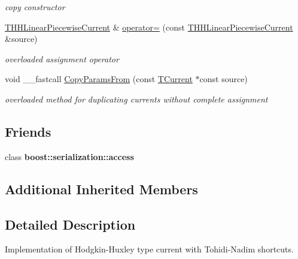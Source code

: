 \begin{DoxyCompactItemize}
\begin{DoxyCompactList}\small\item\em copy constructor \end{DoxyCompactList}\item 
\hypertarget{class_t_h_h_linear_piecewise_current_a4000d88fe350057e43d165737419b816}{\hyperlink{class_t_h_h_linear_piecewise_current}{T\+H\+H\+Linear\+Piecewise\+Current} \& \hyperlink{class_t_h_h_linear_piecewise_current_a4000d88fe350057e43d165737419b816}{operator=} (const \hyperlink{class_t_h_h_linear_piecewise_current}{T\+H\+H\+Linear\+Piecewise\+Current} \&source)}\label{class_t_h_h_linear_piecewise_current_a4000d88fe350057e43d165737419b816}

\begin{DoxyCompactList}\small\item\em overloaded assignment operator \end{DoxyCompactList}\item 
\hypertarget{class_t_h_h_linear_piecewise_current_a884f539c84bd751b9411078cc70cca21}{void \+\_\+\+\_\+fastcall \hyperlink{class_t_h_h_linear_piecewise_current_a884f539c84bd751b9411078cc70cca21}{Copy\+Params\+From} (const \hyperlink{class_t_current}{T\+Current} $\ast$const source)}\label{class_t_h_h_linear_piecewise_current_a884f539c84bd751b9411078cc70cca21}

\begin{DoxyCompactList}\small\item\em overloaded method for duplicating currents without complete assignment \end{DoxyCompactList}\end{DoxyCompactItemize}
\subsection*{Friends}
\begin{DoxyCompactItemize}
\item 
\hypertarget{class_t_h_h_linear_piecewise_current_ac98d07dd8f7b70e16ccb9a01abf56b9c}{class {\bfseries boost\+::serialization\+::access}}\label{class_t_h_h_linear_piecewise_current_ac98d07dd8f7b70e16ccb9a01abf56b9c}

\end{DoxyCompactItemize}
\subsection*{Additional Inherited Members}


\subsection{Detailed Description}
Implementation of Hodgkin-\/\+Huxley type current with Tohidi-\/\+Nadim shortcuts. 


